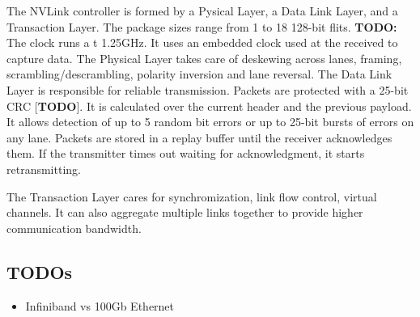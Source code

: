 The NVLink controller is formed by a Pysical Layer, a Data Link Layer, and a Transaction Layer.
The package sizes range from 1 to 18 128-bit flits.
\textbf{TODO:}
The clock runs a t 1.25GHz.
It uses an embedded clock used at the received to capture data.
The Physical Layer takes care of deskewing across lanes, framing, scrambling/descrambling, polarity inversion and lane reversal.
The Data Link Layer is responsible for reliable transmission.
Packets are protected with a 25-bit CRC [\textbf{TODO}].
It is calculated over the current header and the previous payload.
It allows detection of up to 5 random bit errors or up to 25-bit bursts of errors on any lane.
Packets are stored in a replay buffer until the receiver acknowledges them.
If the transmitter times out waiting for acknowledgment, it starts retransmitting.

The Transaction Layer cares for synchromization, link flow control, virtual channels.
It can also aggregate multiple links together to provide higher communication bandwidth.

\subsection{TODOs}
\begin{itemize}
    \item Infiniband vs 100Gb Ethernet
\end{itemize}

%

% 
% 
